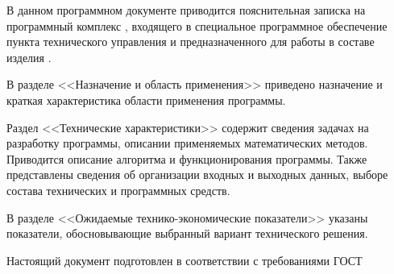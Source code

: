 \newpage\annotation

В данном программном документе приводится пояснительная записка на программный комплекс \programname, входящего в специальное программное обеспечение пункта технического управления и предназначенного для работы в составе изделия \productname.

В разделе <<Назначение и область применения>> приведено назначение и краткая характеристика области применения программы.

Раздел <<Технические характеристики>> содержит сведения задачах на разработку программы, описании применяемых
математических методов. Приводится описание алгоритма и функционирования программы. Также представлены сведения об организации входных и выходных данных, выборе состава технических и программных средств.

В разделе <<Ожидаемые технико-экономические показатели>> указаны показатели, обосновывающие выбранный вариант технического решения.

Настоящий документ подготовлен в соответствии с требованиями ГОСТ~\cite{gost19404}
